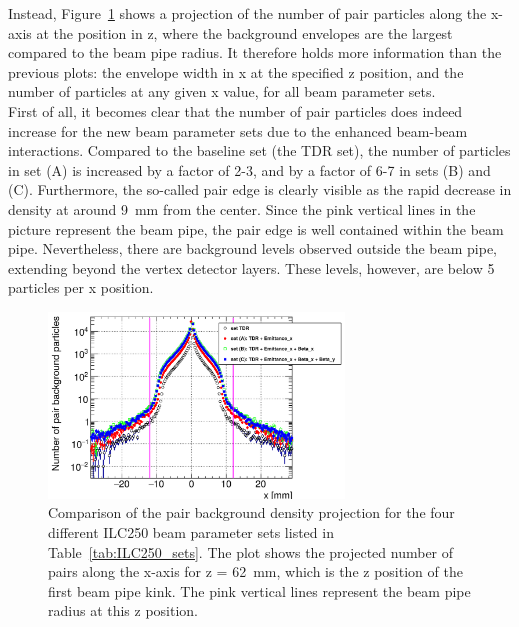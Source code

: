 Instead, Figure~\ref{fig:PairBkg:Density_Projection} shows a projection of the number of pair particles along the x-axis at the position in z, where the background envelopes are the largest compared to the beam pipe radius.
It therefore holds more information than the previous plots: the envelope width in x at the specified z position, and the number of particles at any given x value, for all beam parameter sets.
\\First of all, it becomes clear that the number of pair particles does indeed increase for the new beam parameter sets due to the enhanced beam-beam interactions.
Compared to the baseline set (the TDR set), the number of particles in set (A) is increased by a factor of 2-3, and by a factor of 6-7 in sets (B) and (C).
Furthermore, the so-called pair edge is clearly visible as the rapid decrease in density at around \SI{9}{\milli\meter} from the center.
Since the pink vertical lines in the picture represent the beam pipe, the pair edge is well contained within the beam pipe.
Nevertheless, there are background levels observed outside the beam pipe, extending beyond the vertex detector layers.
These levels, however, are below 5 particles per x position.
\begin{figure}
    \centering
    \includegraphics[width=0.7\textwidth]{Figures/Pairs/HelixEnvelope_Projection_Comparison_250GeV_parametersets_LEG.png}
    \caption[Pair background density projection for different ILC250 beam parameter sets]{
    Comparison of the pair background density projection for the four different ILC250 beam parameter sets listed in Table~\ref{tab:ILC250_sets}.
    The plot shows the projected number of pairs along the x-axis for z = \SI[detect-all]{62}{\milli\meter}, which is the z position of the first beam pipe kink.
    The pink vertical lines represent the beam pipe radius at this z position.
    }
    \label{fig:PairBkg:Density_Projection}
\end{figure}

